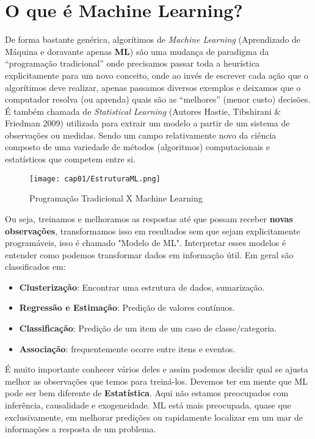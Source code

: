 \section{O que é Machine Learning?}
De forma bastante genérica, algorítimos de \textit{Machine Learning} (Aprendizado de Máquina e doravante apenas \textbf{ML}) são uma mudança de paradigma da “programação tradicional” onde precisamos passar toda a heurística explicitamente para um novo conceito, onde ao invés de escrever cada ação que o algorítimos deve realizar, apenas passamos diversos exemplos e deixamos que o computador resolva (ou aprenda) quais são as “melhores” (menor custo) decisões. É também chamada de \textit{Statistical Learning} (Autores Hastie, Tibshirani \& Friedman 2009) utilizada para extrair um modelo a partir de um sistema de observações ou medidas. Sendo um campo relativamente novo da ciência composto de uma variedade de métodos (algoritmos) computacionais e estatísticos que competem entre si.
\begin{figure}[H]
	\centering
	\texttt{[image: cap01/EstruturaML.png]}
	\caption{Programação Tradicional X Machine Learning}
\end{figure}

Ou seja, treinamos e melhoramos as respostas até que possam receber \textbf{novas observações}, transformamos isso em resultados sem que sejam explicitamente programáveis, isso é chamado "Modelo de ML". Interpretar esses modelos é entender como podemos transformar dados em informação útil. Em geral são classificados em:
\begin{itemize}[noitemsep]
	\item \textbf{Clusterização}: Encontrar uma estrutura de dados, sumarização.
	\item \textbf{Regressão e Estimação}: Predição de valores contínuos.
	\item \textbf{Classificação}: Predição de um item de um caso de classe/categoria.
	\item \textbf{Associação}: frequentemente ocorre entre itens e eventos.
\end{itemize}

É muito importante conhecer vários deles e assim podemos decidir qual se ajusta melhor as observações que temos para treiná-los. Devemos ter em mente que ML pode ser bem diferente de \textbf{Estatística}. Aqui não estamos preocupados com inferência, causalidade e exogeneidade. ML está mais preocupada, quase que exclusivamente, em melhorar predições ou rapidamente localizar em um mar de informações a resposta de um problema. 

